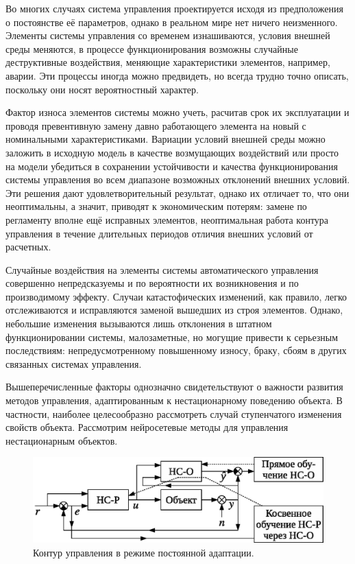 
Во многих случаях система управления проектируется исходя из
предположения о постоянстве её параметров, однако в реальном мире нет
ничего неизменного.  Элементы системы управления со временем
изнашиваются, условия внешней среды меняются, в процессе
функционирования возможны случайные деструктивные воздействия,
меняющие характеристики элементов, например, аварии.  Эти процессы
иногда можно предвидеть, но всегда трудно точно описать, поскольку они
носят вероятностный характер.

Фактор износа элементов системы можно учеть, расчитав срок их
эксплуатации и проводя превентивную замену давно работающего элемента
на новый с номинальными характеристиками.  Вариации условий внешней
среды можно заложить в исходную модель в качестве возмущающих
воздействий или просто на модели убедиться в сохранении устойчивости и
качества функционирования системы управления во всем диапазоне
возможных отклонений внешних условий.  Эти решения дают
удовлетворительный результат, однако их отличает то, что они
неоптимальны, а значит, приводят к экономическим потерям: замене по
регламенту вполне ещё исправных элементов, неоптимальная работа
контура управления в течение длительных периодов отличия внешних
условий от расчетных.

Случайные воздействия на элементы системы автоматического управления
совершенно непредсказуемы и по вероятности их возникновения и по
производимому эффекту.  Случаи катастофических изменений, как правило,
легко отслеживаются и исправляются заменой вышедших из строя
элементов.  Однако, небольшие изменения вызываются лишь отклонения в
штатном функционировании системы, малозаметные, но могущие привести к
серьезным последствиям: непредусмотренному повышенному износу, браку,
сбоям в других связанных системах управления.

Вышеперечисленные факторы однозначно свидетельствуют о важности
развития методов управления, адаптированным к нестационарному
поведению объекта.  В частности, наиболее целесообразно рассмотреть
случай ступенчатого изменения свойств объекта.  Рассмотрим
нейросетевые методы для управления нестационарным объектов.

\begin{figure}[h]
\centering
\includegraphics{permanent_adoption_rus}
\caption{Контур управления в режиме постоянной адаптации.}
\label{fig:permanent_adoption_loop}
\end{figure}

